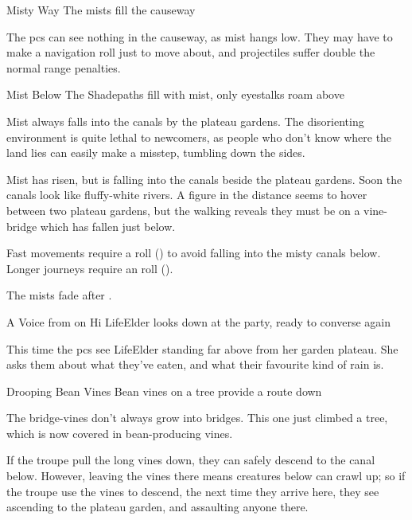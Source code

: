 {Misty Way}%
{The mists fill the causeway}%

The \glspl{pc} can see nothing in the causeway, as mist hangs low.
They may have to make a navigation roll just to move about, and projectiles suffer double the normal range penalties.


{Mist Below}%
{The Shadepaths fill with mist, only eyestalks roam above}%

Mist always falls into the canals by the plateau gardens.
The disorienting environment is quite lethal to newcomers, as people who don't know where the land lies can easily make a misstep, tumbling down the sides.

\begin{boxtext}
  Mist has risen, but is falling into the canals beside the plateau gardens.
  Soon the canals look like fluffy-white rivers.
  A figure in the distance seems to hover between two plateau gardens, but the walking reveals they must be on a vine-bridge which has fallen just below.
\end{boxtext}

Fast movements require a  roll (\tn[8]) to avoid falling into the misty canals below.
Longer journeys require an  roll (\tn[10]).

The mists fade after .

{A Voice from on Hi}%
{LifeElder looks down at the party, ready to converse again}%

This time the \glspl{pc} see \gls{LifeElder} standing far above from her garden plateau.
She asks them about what they've eaten, and what their favourite kind of rain is.

{Drooping Bean Vines}%
{Bean vines on a tree provide a route down}%

The bridge-vines don't always grow into bridges.
This one just climbed a tree, which is now covered in bean-producing vines.

If the troupe pull the long vines down, they can safely descend to the canal below.
However, leaving the vines there means creatures below can crawl up; so if the troupe use the vines to descend, the next time they arrive here, they see  ascending to the plateau garden, and assaulting anyone there.


